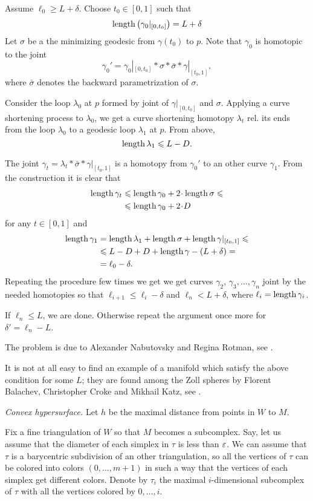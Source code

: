 Assume $\ell_0\ge L+\delta$.
Choose $t_0\in [0,1]$ such that
\[\operatorname{\rm length}\left(\gamma_0|_{[0,t_0]}\right)=L+\delta\]
Let $\sigma$ be a the minimizing geodesic from $\gamma(t_0)$
to $p$.
Note that $\gamma_0$ is homotopic to the joint 
\[\gamma_0'=\gamma_0|_{[0,t_0]}*\sigma*\bar\sigma*\gamma|_{[t_0,1]},\]
where $\bar\sigma$ denotes the backward parametrization of $\sigma$.

Consider the loop $\lambda_0$ at $p$
formed by joint of $\gamma|_{[0,t_0]}$ and $\sigma$.
Applying a curve shortening process to $\lambda_0$, 
we get a curve shortening homotopy $\lambda_t$
rel. its ends 
from the loop $\lambda_0$ to a geodesic loop $\lambda_1$ at $p$.
From above, 
\[\operatorname{\rm length}\lambda_1\leqslant L-D.\]

The joint $\gamma_t=\lambda_t*\bar\sigma*\gamma|_{[t_0,1]}$
is a homotopy
from $\gamma_0'$ to an other curve $\gamma_1$.
From the construction it is clear that 
\begin{align*}
 \length \gamma_t&\le \length \gamma_0+2\cdot \length\sigma\le
 \\
 &\le \length \gamma_0+2\cdot D
\end{align*}
for any $t\in[0,1]$
and 
\begin{align*}
 \operatorname{\rm length} \gamma_1&=\operatorname{\rm length}\lambda_1+\operatorname{\rm length}\sigma+\operatorname{\rm length}\gamma|_{[t_0,1]}\leqslant
\\ &\leqslant L-D+D+\operatorname{\rm length}\gamma-(L+\delta)=
\\ &=\ell_0 -\delta.
\end{align*}
Repeating the procedure few times we get we get curves $\gamma_2$, $\gamma_3,\dots,\gamma_n$
joint by the needed homotopies so that 
$\ell_{i+1}\le\ell_i-\delta$ and $\ell_n< L+\delta$,
where $\ell_i=\operatorname{\rm length}\gamma_i$.

If $\ell_n\le L$, we are done.
Otherwise repeat the argument once more for $\delta'=\ell_n-L$.

The problem is due to 
Alexander Nabutovsky 
and Regina Rotman,
see \cite{nabutovsky-rotman}.

It is not at all easy to find an example of a manifold  which satisfy the above condition for some $L$;
they are found among the Zoll spheres
by Florent Balachev, Christopher Croke and Mikhail Katz, 
see \cite{balacheff-croke-katz}.

\textit{Convex hypersurface.}
Let $h$ be the maximal distance from points in $W$ to $M$.

Fix a fine triangulation of $W$ 
so that $M$ becomes a subcomplex.
Say, let us assume that the diameter of each simplex in $\tau$ is less than 
$\varepsilon$.
We can assume that $\tau$ is a barycentric subdivision of an other triangulation, so all the vertices of $\tau$ can be colored into colors $(0,\dots, m+1)$
in such a way that the vertices of each simplex 
get different colors.
Denote by $\tau_i$ the maximal $i$-dimensional subcomplex of $\tau$ 
with all the vertices colored by $0,\dots, i$.

